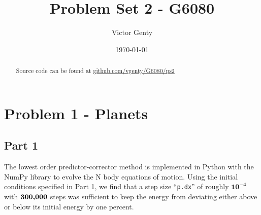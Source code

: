 \documentclass[singlepage,notitlepage,nofootinbib,11pt]{revtex4-1}
\begin{document}
\title{Problem Set 2 - G6080}
\author{Victor Genty}
\date{\today}
\begin{abstract}
\centering
Source code can be found at \href{https://github.com/vgenty/G6080/tree/master/ps2}{github.com/vgenty/G6080/ps2}
\end{abstract}
\maketitle
\section{Problem 1 - Planets}
\subsection{Part 1}
The lowest order predictor-corrector method is implemented in Python with the NumPy library to evolve the N body equations of motion. Using the initial conditions specified in Part 1, we find that a step size ``\verb|p.dx|'' of roughly $\mathbf{10^{-4}}$ with $\mathbf{300}\text{\bf{,}}\mathbf{000}$ steps was sufficient to keep the energy from deviating either above or below its initial energy by one percent.
\end{document}
